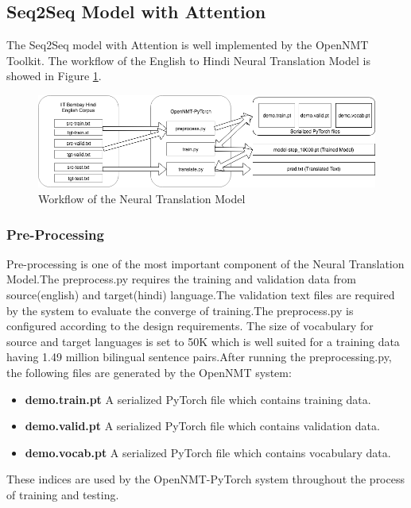 \subsection{Seq2Seq Model with Attention}
The Seq2Seq model with Attention is well implemented by the OpenNMT Toolkit. The workflow of the English to Hindi Neural Translation Model is showed in Figure \ref{nmtwork}.

\begin{figure}
\includegraphics[width=\textwidth]{figures/nmtwork.png}
\caption{Workflow of the Neural Translation Model} 
\label{nmtwork}
\end{figure}

\subsubsection{Pre-Processing} 
Pre-processing is one of the most important component of the Neural Translation Model.The preprocess.py requires the training and validation data from source(english) and target(hindi) language.The validation text files are required by the system to evaluate the converge of training.The preprocess.py is configured according to the design requirements. The size of vocabulary for source and target languages is set to 50K which is well suited for a training data having 1.49 million bilingual sentence pairs.After running the preprocessing.py, the following files are generated by the OpenNMT system:
\begin{itemize}
    \item \textbf{demo.train.pt} A serialized PyTorch file which contains training data.
    \item \textbf{demo.valid.pt} A serialized PyTorch file which contains validation data.
    \item \textbf{demo.vocab.pt} A serialized PyTorch file which contains vocabulary data.
\end{itemize}

These indices are used by the OpenNMT-PyTorch system throughout the process of training and testing. 
